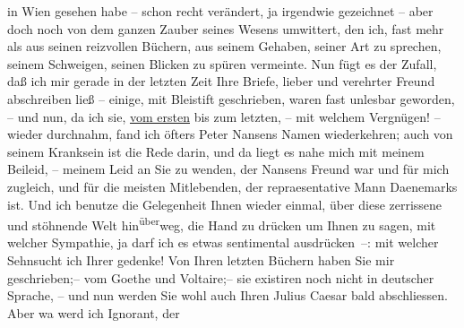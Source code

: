 \begin{ledgroupsized}[t]{13cm}
               in Wien gesehen habe – schon recht verändert, ja
               irgendwie gezeichnet – aber doch noch von dem ganzen Zauber seines Wesens umwittert,
               den ich, fast mehr als aus seinen reizvollen Büchern, aus seinem Gehaben, seiner Art
               zu sprechen, seinem Schweigen, seinen Blicken zu spüren vermeinte. Nun fügt es der
               Zufall, daß ich mir gerade in der letzten Zeit Ihre Briefe, lieber und verehrter
               Freund abschreiben ließ – einige, mit Bleistift geschrieben, waren fast unlesbar
               geworden, – und nun, da ich sie, \uline{vom ersten} bis zum
               letzten,  – mit welchem Vergnügen! – wieder
               durchnahm, fand ich öfters Peter Nansens Namen
               wiederkehren; auch von seinem Kranksein ist die Rede darin, und da liegt es nahe mich
               mit meinem Beileid, – meinem Leid an Sie zu wenden, der Nansens Freund war und für mich zugleich, und für die meisten
               Mitlebenden, {\pb}der repraesentative Mann Daenemarks ist. Und ich benutze die Gelegenheit
               Ihnen wieder einmal, über diese zerrissene und stöhnende Welt hin\substVorne{}\textsuperscript{über}\substDazwischen{}weg\substHinten{}, die Hand zu drücken um Ihnen zu sagen, mit welcher Sympathie, ja darf ich
               es etwas sentimental ausdrücken –: mit welcher Sehnsucht ich Ihrer gedenke! Von Ihren
               letzten Büchern haben Sie mir geschrieben;– vom Goethe und Voltaire;– sie existiren noch nicht in deutscher Sprache, – und nun werden Sie wohl auch
               Ihren Julius Caesar bald abschliessen. Aber wa{\geminationn} werd ich Ignorant, der

\end{ledgroupsized}
